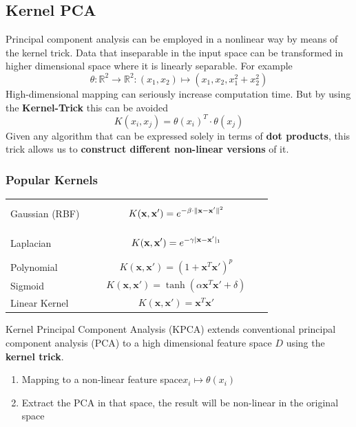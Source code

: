 \documentclass[11pt]{article}
\theoremstyle{definition}
\newcommand*\R{\mathbb{R}}
\DeclarePairedDelimiter\abs{\lvert}{\rvert}
\DeclarePairedDelimiter\norm{\lVert}{\rVert}
\begin{document}
\subsection{Kernel PCA}
Principal component analysis can be employed in a nonlinear way by means of the kernel trick. Data that inseparable in the input space can be transformed in higher dimensional space where it is linearly separable. For example
\begin{equation*}
	\theta: \R^2 \rightarrow \R^2 : (x_1,x_2) \mapsto (x_1,x_2, x_1^2 + x_2^2)
\end{equation*}
High-dimensional mapping can seriously increase computation time. But by using the \textbf{Kernel-Trick} this can be avoided
\begin{equation*}
	K(x_i,x_j) = \theta(x_i)^T\cdot \theta(x_j)
\end{equation*}
Given any algorithm that can be expressed solely in terms of \textbf{dot products}, this trick allows us to \textbf{construct different non-linear versions} of it.

\subsubsection{Popular Kernels}
\begin{tabularx}{\linewidth}{m{0.3\linewidth} m{0.7\linewidth}}
	Gaussian (RBF) & \[ K(\textbf{x},\textbf{x}') = e^{-\beta\cdot\norm{\textbf{x}-\textbf{x}'}^2} \]\\
	Laplacian & \[ K(\textbf{x},\textbf{x}') = e^{-\gamma\abs{\textbf{x}-\textbf{x}'}_1} \]\\
	Polynomial & \[ K(\textbf{x},\textbf{x}') = (1+\textbf{x}^T\textbf{x}')^p \]\\
	Sigmoid & \[ K(\textbf{x},\textbf{x}') = \tanh(\alpha \textbf{x}^T\textbf{x}' + \delta) \]\\
	Linear Kernel & \[ K(\textbf{x},\textbf{x}') = \textbf{x}^T\textbf{x}' \]\\
\end{tabularx}
\noindent
Kernel Principal Component Analysis (KPCA) extends conventional principal component analysis (PCA) to a high dimensional feature space $D$ using the \textbf{kernel trick}.
\begin{enumerate}
	\item Mapping to a non-linear feature space\quad$x_i\mapsto\theta(x_i)$
	\item Extract the PCA in that space, the result will be non-linear in the original space
\end{enumerate}
\end{document}
